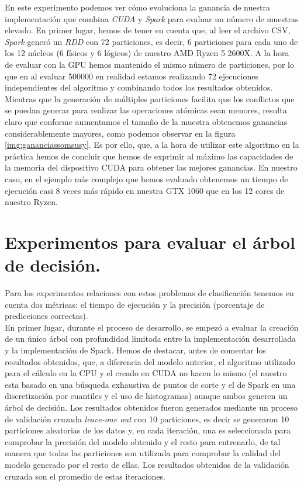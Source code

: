 En este experimento podemos ver cómo evoluciona la ganancia de nuestra implementación que combina \textit{CUDA} y \textit{Spark} para evaluar un número de muestras elevado. En primer lugar, hemos de tener en cuenta que, al leer el archivo CSV, \textit{Spark} generó un \textit{RDD} con 72 particiones, es decir, 6 particiones para cada uno de los 12 núcleos (6 físicos y 6 lógicos) de nuestro AMD Ryzen 5 2600X. A la hora de evaluar con la GPU hemos mantenido el mismo número de particiones, por lo que en al evaluar 500000 en realidad estamos realizando 72 ejecuciones independientes del algoritmo y combinando todos los resultados obtenidos. Mientras que la generación de múltiples particiones facilita que los conflictos que se puedan generar para realizar las operaciones atómicas sean menores, resulta claro que conforme aumentamos el tamaño de la muestra obtenemos ganancias considerablemente mayores, como podemos observar en la figura \ref{img:gananciassomsusy}. Es por ello, que, a la hora de utilizar este algoritmo en la práctica hemos de concluir que hemos de exprimir al máximo las capacidades de la memoria del dispositivo CUDA para obtener las mejores ganancias. En nuestro caso, en el ejemplo más complejo que hemos evaluado obtenemos un tiempo de ejecución casi 8 veces más rápido en nuestra GTX 1060 que en los 12 cores de nuestro Ryzen.

\newpage
\section{Experimentos para evaluar el árbol de decisión.}
Para los experimentos relaciones con estos problemas de clasificación tenemos en cuenta dos métricas: el tiempo de ejecución y la precisión (porcentaje de predicciones correctas).\\

En primer lugar, durante el proceso de desarrollo, se empezó a evaluar la creación de un único árbol con profundidad limitada entre la implementación desarrollada y la implementación de Spark. Hemos de destacar, antes de comentar los resultados obtenidos, que, a diferencia del modelo anterior, el algoritmo utilizado para el cálculo en la CPU y el creado en CUDA no hacen lo mismo (el nuestro esta basado en una búsqueda exhaustiva de puntos de corte y el de Spark en una discretización por cuantiles y el uso de histogramas) aunque ambos generen un árbol de decisión. Los resultados obtenidos fueron generados mediante un proceso de validación cruzada \textit{leave-one out} con 10 particiones, es decir se generaron 10 particiones aleatorias de los datos y, en cada iteración, una es seleccionada para comprobar la precisión del modelo obtenido y el resto para entrenarlo, de tal manera que todas las particiones son utilizada para comprobar la calidad del modelo generado por el resto de ellas. Los resultados obtenidos de la validación cruzada son el promedio de estas iteraciones.
\newpage
